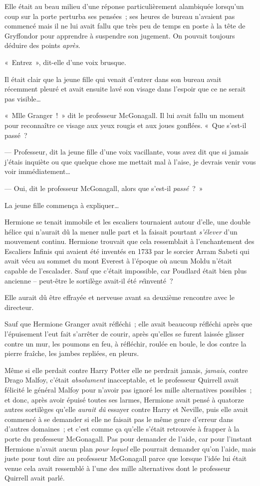 Elle était au beau milieu d'une réponse particulièrement alambiquée lorsqu'un coup sur la porte perturba ses pensées~; ses heures de bureau n'avaient pas commencé mais il ne lui avait fallu que très peu de temps en poste à la tête de Gryffondor pour apprendre à suspendre son jugement. On pouvait toujours déduire des points \emph{après}.

«~Entrez~», dit-elle d'une voix brusque.

Il était clair que la jeune fille qui venait d'entrer dans son bureau avait récemment pleuré et avait ensuite lavé son visage dans l'espoir que ce ne serait pas visible…

«~Mlle Granger~!~» dit le professeur McGonagall. Il lui avait fallu un moment pour reconnaître ce visage aux yeux rougis et aux joues gonflées. «~Que s'est-il passé~?

--- Professeur, dit la jeune fille d'une voix vacillante, vous avez dit que si jamais j'étais inquiète ou que quelque chose me mettait mal à l'aise, je devrais venir vous voir immédiatement…

--- Oui, dit le professeur McGonagall, alors que s'est-il \emph{passé}~?~»

La jeune fille commença à expliquer…

\later

Hermione se tenait immobile et les escaliers tournaient autour d'elle, une double hélice qui n'aurait dû la mener nulle part et la faisait pourtant \emph{s'élever} d'un mouvement continu. Hermione trouvait que cela ressemblait à l'enchantement des Escaliers Infinis qui avaient été inventés en 1733 par le sorcier Arram Sabeti qui avait vécu au sommet du mont Everest à l'époque où aucun Moldu n'était capable de l'escalader. Sauf que c'était impossible, car Poudlard était bien plus ancienne -- peut-être le sortilège avait-il été \emph{ré}inventé~?

Elle aurait dû être effrayée et nerveuse avant sa deuxième rencontre avec le directeur.

Sauf que Hermione Granger avait réfléchi~; elle avait beaucoup réfléchi après que l'épuisement l'eut fait s'arrêter de courir, après qu'elles se furent laissée glisser contre un mur, les poumons en feu, à réfléchir, roulée en boule, le dos contre la pierre fraîche, les jambes repliées, en pleurs.

Même si elle perdait contre Harry Potter elle ne perdrait jamais, \emph{jamais}, contre Drago Malfoy, c'était \emph{absolument} inacceptable, et le professeur Quirrell avait félicité le général Malfoy pour n'avoir pas ignoré les mille alternatives possibles~; et donc, après avoir épuisé toutes ses larmes, Hermione avait pensé à quatorze autres sortilèges qu'elle \emph{aurait dû} essayer contre Harry et Neville, puis elle avait commencé à se demander si elle ne faisait pas le même genre d'erreur dans d'autres domaines~; et c'est comme ça qu'elle s'était retrouvée à frapper à la porte du professeur McGonagall. Pas pour demander de l'aide, car pour l'instant Hermione n'avait aucun plan \emph{pour lequel} elle pourrait demander qu'on l'aide, mais juste pour tout dire au professeur McGonagall parce que lorsque l'idée lui était venue cela avait ressemblé à l'une des mille alternatives dont le professeur Quirrell avait parlé.

